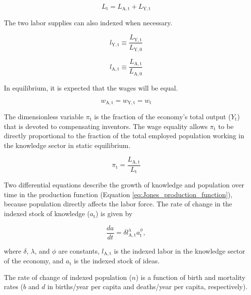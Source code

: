 \documentclass[letterpaper,12pt]{article}
\begin{document}
\begin{equation} \label{labor_supply}
	L_\mathrm{t} = L_\mathrm{A,t} + L_\mathrm{Y,t}
\end{equation}

The two labor supplies can also indexed when necessary.

\begin{equation}
	l_\mathrm{Y,t} \equiv \frac{L_\mathrm{Y,t}}{L_\mathrm{Y,0}}
\end{equation}

\begin{equation}
	l_\mathrm{A,t} \equiv \frac{L_\mathrm{A,t}}{L_\mathrm{A,0}}
\end{equation}

In equilibrium, it is expected that the wages will be equal.

\begin{equation} \label{eq:wage_equality}
	w_\mathrm{A,t} = w_\mathrm{Y,t} = w_\mathrm{t}
\end{equation}

The dimensionless variable $\pi_\mathrm{t}$ is the fraction of the economy's total output ($Y_\mathrm{t}$) that is devoted to compensating inventors. The wage equality allows $\pi_\mathrm{t}$ to be directly proportional to the fraction of the total employed population working in the knowledge sector in static equilibrium.

\begin{equation} \label{eq:pi}
	\pi_\mathrm{t} = \frac{L_\mathrm{A,t}}{L_\mathrm{t}}
\end{equation}

Two differential equations describe the growth of knowledge and population over time in the production function (Equation \ref{eq:Jones_production_function}), because population directly affects the labor force. The rate of change in the indexed stock of knowledge ($a_{\mathrm{t}}$) is given by

\begin{equation} \label{eq:da_dt}
	\frac{da}{dt} = \delta l_\mathrm{A,t}^\lambda a_\mathrm{t}^\phi,
\end{equation}

\noindent where $\delta$, $\lambda$, and $\phi$ are constants, $l_\mathrm{A,t}$ is the indexed labor in the knowledge sector of the economy, and $a_\mathrm{t}$ is the indexed stock of ideas.

The rate of change of indexed population ($n$) is a function of birth and mortality rates ($b$ and $d$ in births/year per capita and deaths/year per capita, respectively).
\end{document}
